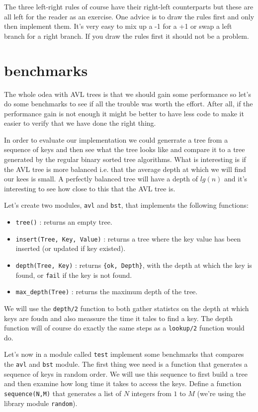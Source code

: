 \documentclass[a4paper,11pt]{article}
\begin{document}
The three left-right rules of course have their right-left counterparts
but these are all left for the reader as an exercise. One advice is to
draw the rules first and only then implement them. It's very easy to
mix up a -1 for a +1 or swap a left branch for a right branch. If you
draw the rules first it should not be a problem.

\section{benchmarks}

The whole odea with AVL trees is that we should gain some performance
so let's do some benchmarks to see if all the trouble was worth the
effort. After all, if the performance gain is not enough it might be
better to have less code to make it easier to verify that we have done
the right thing.

In order to evaluate our implementation we could generrate a tree from
a sequence of keys and then see what the tree looks like and compare
it to a tree generated by the regular binary sorted tree
algorithms. What is interesting is if the AVL tree is more balanced
i.e. that the average depth at which we will find our kees is small. A
perfectly balanced tree will have a depth of $lg(n)$ and it's
interesting to see how close to this that the AVL tree is.

Let's create two modules, {\tt avl} and {\tt bst}, that implements the
following functions:

\begin{itemize}
\item {\tt tree()} : returns an empty tree.
\item {\tt insert(Tree, Key, Value)} : returns a tree where the key value has been inserted (or updated if key existed).
\item {\tt depth(Tree, Key)} : returns {\tt \{ok, Depth\}}, with the depth at which the key is found, or {\tt fail} if the key is not found. 
\item {\tt max_depth(Tree)} : returns the maximum depth of the tree. 
\end{itemize}

We will use the {\tt depth/2} function to both gather statistcs on the
depth at which keys are foudn and also meassure the time it tales to
find a key. The depth function will of course do exactly the same
steps as a {\tt lookup/2} function would do.

Let's now in a module called {\tt test} implement some benchmarks that
compares the {\tt avl} and {\tt bst} module. The first thing wee need
is a function that generates a sequence of keys in random order. We
will use this sequence to first build a tree and then examine how long
time it takes to access the keys. Define a function {\tt
  sequence(N,M)} that generates a list of $N$ integers from $1$ to $M$
(we're using the library module {\tt random}). 
\end{document}
